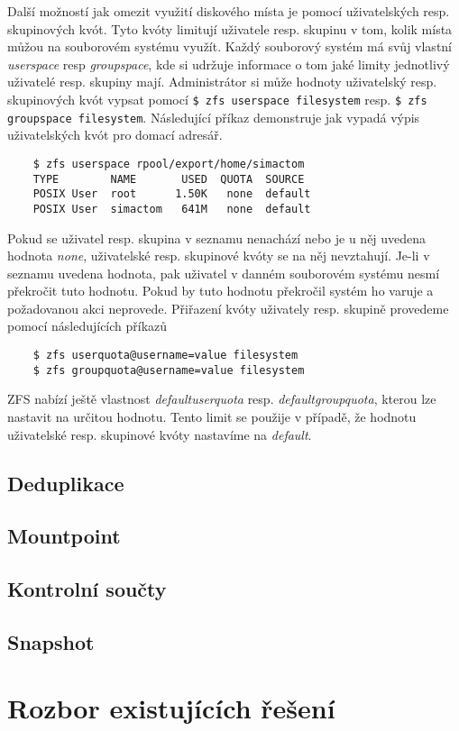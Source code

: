     Další možností jak omezit využití diskového místa je pomocí uživatelských resp. skupinových kvót. Tyto kvóty limitují uživatele resp. skupinu v tom, kolik místa můžou na souborovém systému využít. Každý souborový systém má svůj vlastní \emph{userspace} resp \emph{groupspace}, kde si udržuje informace o tom jaké limity jednotlivý uživatelé resp. skupiny mají.
    Administrátor si může hodnoty uživatelský resp. skupinových kvót vypsat pomocí \verb|$ zfs userspace filesystem| resp. \verb|$ zfs groupspace filesystem|. Následující příkaz demonstruje jak vypadá výpis uživatelských kvót pro domací adresář.     
    \begin{verbatim}
    $ zfs userspace rpool/export/home/simactom
    TYPE        NAME       USED  QUOTA  SOURCE
    POSIX User  root      1.50K   none  default
    POSIX User  simactom   641M   none  default
    \end{verbatim}
    
    Pokud se uživatel resp. skupina v seznamu nenachází nebo je u něj uvedena hodnota \emph{none}, uživatelské resp. skupinové kvóty se na něj nevztahují. Je-li v seznamu uvedena hodnota, pak uživatel v danném souborovém systému nesmí překročit tuto hodnotu. Pokud by tuto hodnotu překročil systém ho varuje a požadovanou akci neprovede. Přiřazení kvóty uživately resp. skupině provedeme pomocí následujících příkazů
    \begin{verbatim}
    $ zfs userquota@username=value filesystem
    $ zfs groupquota@username=value filesystem
    \end{verbatim}   
        
    ZFS nabízí ještě vlastnost \emph{defaultuserquota} resp. \emph{defaultgroupquota}, kterou lze nastavit na určitou hodnotu. Tento limit se použije v případě, že hodnotu uživatelské resp. skupinové kvóty nastavíme na \emph{default}.
    
    
        
    

    
    
    
    \subsection{Deduplikace}
    \label{dedup}
    \subsection{Mountpoint}
    \label{mount}        
    \subsection{Kontrolní součty}
    \label{checksum}
    \subsection{Snapshot}
    \label{snapshot}
\section{Rozbor existujících řešení}


